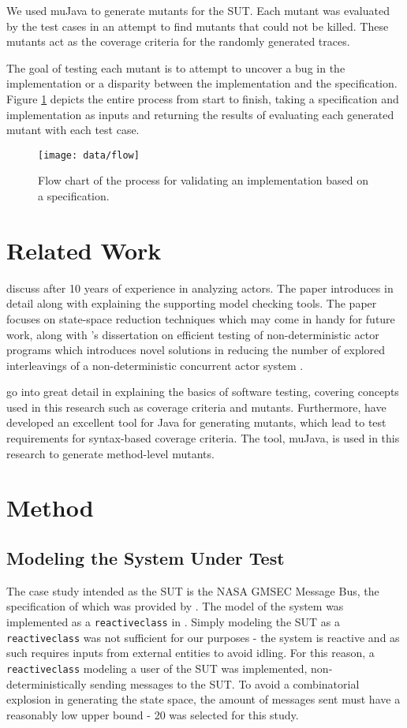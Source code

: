 \documentclass{article}
\begin{document}
		We used muJava to generate mutants for the SUT. Each mutant was evaluated by the test cases in an attempt to find mutants that could not be killed. These mutants act as the coverage criteria for the randomly generated traces.

		The goal of testing each mutant is to attempt to uncover a bug in the implementation or a disparity between the implementation and the specification. Figure \ref{fig:flow} depicts the entire process from start to finish, taking a specification and implementation as inputs and returning the results of evaluating each generated mutant with each test case.

\begin{figure}[h!]
	\texttt{[image: data/flow]}
	\caption{Flow chart of the process for validating an implementation based on a specification.}
	\label{fig:flow}
\end{figure}

	\section{Related Work}
	\citet{DBLP:conf/birthday/SirjaniJ11} discuss \Rebeca after 10 years of experience in analyzing actors. The paper introduces \Rebeca in detail along with explaining the supporting model checking tools. The paper focuses on state-space reduction techniques which may come in handy for future work, along with \citeauthor{tasharofi2014efficient}'s dissertation on efficient testing of non-deterministic actor programs which introduces novel solutions in reducing the number of explored interleavings of a non-deterministic concurrent actor system \citep{tasharofi2014efficient}.

		\citet{ammann2008introduction} go into great detail in explaining the basics of software testing, covering concepts used in this research such as coverage criteria and mutants. Furthermore, \citet{mujava} have developed an excellent tool for Java for generating mutants, which lead to test requirements for syntax-based coverage criteria. The tool, muJava, is used in this research to generate method-level mutants.

		
	\section{Method}
		\subsection{Modeling the System Under Test}
			The case study intended as the SUT is the NASA GMSEC Message Bus, the specification of which was provided by \citeauthor{fraunhofer}. The model of the system was implemented as a \texttt{reactiveclass} in \Rebeca. Simply modeling the SUT as a \texttt{reactiveclass} was not sufficient for our purposes \-- the system is reactive and as such requires inputs from external entities to avoid idling. For this reason, a \texttt{reactiveclass} modeling a user of the SUT was implemented, non-deterministically sending messages to the SUT. To avoid a combinatorial explosion in generating the state space, the amount of messages sent must have a reasonably low upper bound \-- 20 was selected for this study.
\end{document}
